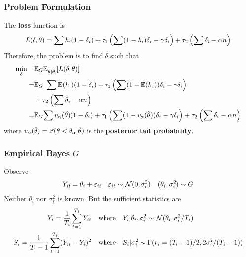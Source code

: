 \documentclass[10pt,mathserif]{beamer}
\begin{document}
\begin{frame}
  \frametitle{Problem Formulation}
  The \textbf{loss} function is
  \begin{equation*}
    L(\delta,\theta)=\sum h_i(1-\delta_i) +\tau_1\left(\sum (1-h_i)\delta_i -\gamma \delta_i\right) + \tau_2 \left(\sum \delta_i -\alpha n\right)
  \end{equation*}
  Therefore, the problem is to find $\delta$ such that
  \begin{align*}
    \min_{\delta} \quad & \mathbb{E}_G\mathbb{E}_{\theta|\hat{\theta}}\left[L(\delta,\theta)\right]                                                                                                       \\
    =                   & \mathbb{E}_G \ \sum \mathbb{E}(h_i)(1-\delta_i) +\tau_1\left(\sum (1-\mathbb{E}(h_i))\delta_i -\gamma \delta_i\right)                                                                    \\
                        & + \tau_2 \left(\sum \delta_i -\alpha n\right)                                                                                                                    \\
    =                   & \mathbb{E}_G{\sum v_\alpha(\hat{\theta})(1-\delta_i) +\tau_1\left(\sum (1-v_\alpha(\hat{\theta}))\delta_i -\gamma \delta_i\right) + \tau_2 \left(\sum \delta_i -\alpha n\right)} \\
  \end{align*} where $v_\alpha(\hat{\theta})=\mathbb{P}(\theta<\theta_\alpha|\hat{\theta})$ is the \textbf{posterior tail probability}.
\end{frame}

\begin{frame}
  \frametitle{Empirical Bayes $G$}
  Observe
  \begin{equation*}
    Y_{it} = \theta_i + \varepsilon_{it} \quad \varepsilon_{it} \sim \mathcal{N}(0,\sigma_i^2) \quad (\theta_i,\sigma_i^2) \sim G
  \end{equation*}
  Neither $\theta_i$ nor $\sigma_i^2$ is known. But the sufficient statistics are
  \begin{align*}
    Y_i=\frac{1}{T_i}\sum_{t=1}^{T_i}Y_{it}           & \quad \text{where}\quad Y_i|\theta_i,\sigma_i^2 \sim \mathcal{N}(\theta_i,\sigma_i^2/T_i)     \\
    S_i=\frac{1}{T_i-1}\sum_{t=1}^{T_i}(Y_{it}-Y_i)^2 & \quad \text{where} \quad S_i|\sigma_i^2 \sim \Gamma(r_i= (T_i-1)/2,2\sigma_i^2/(T_i-1)) \\
  \end{align*}
\end{frame}
\end{document}
